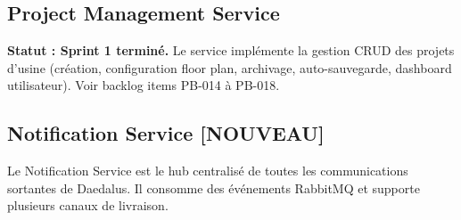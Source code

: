 \documentclass[12pt,a4paper]{article}
\newcommand{\NEW}{\textcolor{daedalusgold}{\textbf{[NOUVEAU]}}}
\begin{document}
\subsection{Project Management Service}

\textbf{Statut : Sprint 1 terminé.} Le service implémente la gestion CRUD des projets d'usine (création, configuration floor plan, archivage, auto-sauvegarde, dashboard utilisateur). Voir backlog items PB-014 à PB-018.

\subsection{Notification Service \NEW}

Le Notification Service est le hub centralisé de toutes les communications sortantes de Daedalus. Il consomme des événements RabbitMQ et supporte plusieurs canaux de livraison.
\end{document}
